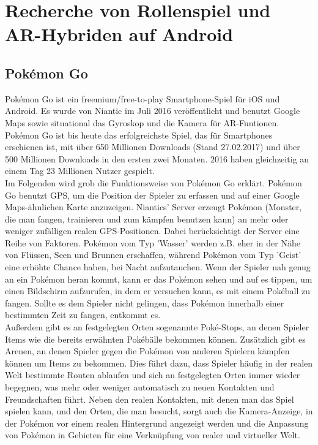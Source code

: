 \documentclass[extern,palatino]{cgBA}
\begin{document}
\section{Recherche von Rollenspiel und AR-Hybriden auf Android}
\subsection{Pokémon Go}
Pokémon Go ist ein freemium/free-to-play Smartphone-Spiel für iOS und Android. Es wurde von Niantic im Juli 2016 veröffentlicht und benutzt Google Maps sowie situational das Gyroskop und die Kamera für AR-Funtionen. 
\\Pokémon Go ist bis heute das erfolgreichste Spiel, das für Smartphones erschienen ist, mit über 650 Millionen Downloads (Stand 27.02.2017) und über 500 Millionen Downloads in den ersten zwei  Monaten.%
2016 haben gleichzeitig an einem Tag 23 Millionen Nutzer gespielt.
\\
Im Folgenden wird grob die Funktionsweise von Pokémon Go erklärt. Pokémon Go benutzt GPS, um die Position der Spieler zu erfassen und auf einer Google Maps-ähnlichen Karte anzuzeigen. Niantics' Server erzeugt Pokémon (Monster, die man fangen, trainieren und zum kämpfen benutzen kann) an mehr oder weniger zufälligen realen GPS-Positionen. Dabei berücksichtigt der Server eine Reihe von Faktoren. Pokémon vom Typ 'Wasser' werden z.B. eher in der Nähe von Flüssen, Seen und Brunnen erschaffen, während Pokémon vom Typ 'Geist' eine erhöhte Chance haben, bei Nacht aufzutauchen. Wenn der Spieler nah genug an ein Pokémon heran kommt, kann er das Pokémon sehen und auf es tippen, um einen Bildschirm aufzurufen, in dem er versuchen kann, es mit einem Pokéball zu fangen. Sollte es dem Spieler nicht gelingen, dass Pokémon innerhalb einer bestimmten Zeit zu fangen, entkommt es.
\\Außerdem gibt es an festgelegten Orten sogenannte Poké-Stops, an denen Spieler Items wie die bereits erwähnten Pokébälle bekommen können. Zusätzlich gibt es Arenen, an denen Spieler gegen die Pokémon von anderen Spielern kämpfen können um Items zu bekommen. Dies führt dazu, dass Spieler häufig in der realen Welt bestimmte Routen ablaufen und sich an festgelegten Orten immer wieder begegnen, was mehr oder weniger automatisch zu neuen Kontakten und Freundschaften führt. Neben den realen Kontakten, mit denen man das Spiel spielen kann, und den Orten, die man besucht, sorgt auch die Kamera-Anzeige, in der Pokémon vor einem realen Hintergrund angezeigt werden und die Anpassung von Pokémon in Gebieten für eine Verknüpfung von realer und virtueller Welt. 
\end{document}
